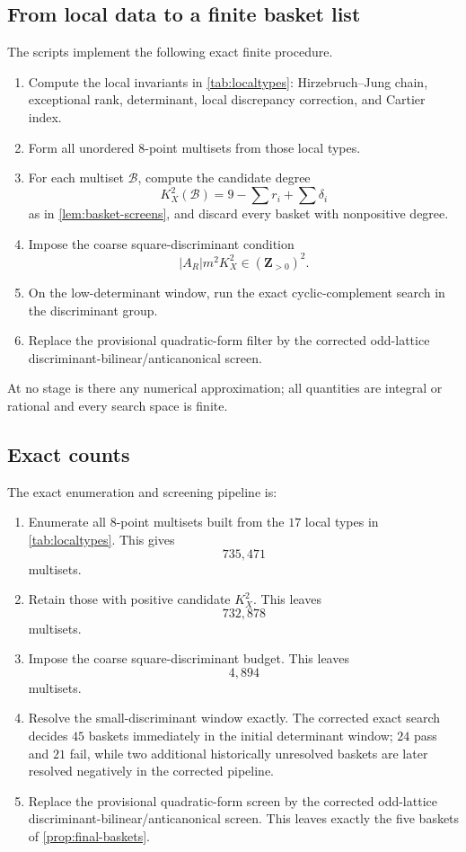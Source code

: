 \documentclass[11pt]{article}
\theoremstyle{definition}
\begin{document}
\subsection{From local data to a finite basket list}
The scripts implement the following exact finite procedure.
\begin{enumerate}[label=\textup{(\alph*)}]
\item Compute the local invariants in \cref{tab:localtypes}: Hirzebruch--Jung chain, exceptional rank, determinant, local discrepancy correction, and Cartier index.
\item Form all unordered $8$-point multisets from those local types.
\item For each multiset $\mathcal B$, compute the candidate degree
\[
K_X^2(\mathcal B)=9-\sum r_i+\sum \delta_i
\]
as in \cref{lem:basket-screens}, and discard every basket with nonpositive degree.
\item Impose the coarse square-discriminant condition
\[
|A_R|m^2K_X^2\in (\mathbf Z_{>0})^2.
\]
\item On the low-determinant window, run the exact cyclic-complement search in the discriminant group.
\item Replace the provisional quadratic-form filter by the corrected odd-lattice discriminant-bilinear/anticanonical screen.
\end{enumerate}
At no stage is there any numerical approximation; all quantities are integral or rational and every search space is finite.

\subsection{Exact counts}
The exact enumeration and screening pipeline is:
\begin{enumerate}[label=\textup{(\arabic*)}]
\item Enumerate all $8$-point multisets built from the $17$ local types in \cref{tab:localtypes}. This gives
\[
735{,}471
\]
multisets.
\item Retain those with positive candidate $K_X^2$. This leaves
\[
732{,}878
\]
multisets.
\item Impose the coarse square-discriminant budget. This leaves
\[
4{,}894
\]
multisets.
\item Resolve the small-discriminant window exactly. The corrected exact search decides $45$ baskets immediately in the initial determinant window; $24$ pass and $21$ fail, while two additional historically unresolved baskets are later resolved negatively in the corrected pipeline.
\item Replace the provisional quadratic-form screen by the corrected odd-lattice discriminant-bilinear/anticanonical screen. This leaves exactly the five baskets of \cref{prop:final-baskets}.
\end{enumerate}
\end{document}
